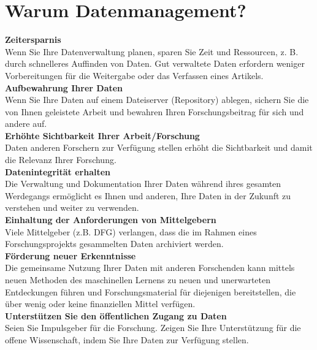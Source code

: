 \section{Warum Datenmanagement?}

\textbf{Zeitersparnis} \\
Wenn Sie Ihre Datenverwaltung planen, sparen Sie Zeit und Ressourcen, z. B.
durch schnelleres Auffinden von Daten. Gut verwaltete Daten erfordern weniger
Vorbereitungen für die Weitergabe oder das Verfassen eines Artikels. \\[6pt]
%
\textbf{Aufbewahrung Ihrer Daten} \\
Wenn Sie Ihre Daten auf einem Dateiserver (Repository) ablegen, sichern Sie
die von Ihnen geleistete Arbeit und bewahren Ihren Forschungsbeitrag für
sich und andere auf. \\[6pt]
%
\textbf{Erhöhte Sichtbarkeit Ihrer Arbeit/Forschung} \\
Daten anderen Forschern zur Verfügung stellen erhöht die Sichtbarkeit und damit die Relevanz Ihrer Forschung. \\[6pt]
%
\textbf{Datenintegrität erhalten} \\
Die Verwaltung und Dokumentation Ihrer Daten während ihres gesamten Werdegangs
ermöglicht es Ihnen und anderen, Ihre Daten in der Zukunft zu verstehen und
weiter zu verwenden.\\[6pt]
%
\textbf{Einhaltung der Anforderungen von Mittelgebern} \\
Viele Mittelgeber (z.B. DFG) verlangen, dass die im Rahmen eines
Forschungsprojekts gesammelten Daten archiviert werden.\\[6pt]
%
\textbf{Förderung neuer Erkenntnisse} \\
Die gemeinsame Nutzung Ihrer Daten mit anderen Forschenden kann mittels neuen
Methoden des maschinellen Lernens zu neuen und unerwarteten Entdeckungen führen
und Forschungsmaterial für diejenigen bereitstellen, die über wenig oder keine
finanziellen Mittel verfügen. \\[6pt]
%
\textbf{Unterstützen Sie den öffentlichen Zugang zu Daten} \\
Seien Sie Impulsgeber für die Forschung. Zeigen Sie Ihre Unterstützung für die
offene Wissenschaft, indem Sie Ihre Daten zur Verfügung stellen.
